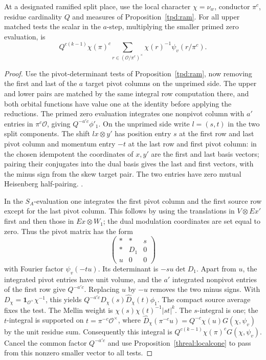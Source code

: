\begin{corollary}\label{threal:ramA}
At a designated ramified split place, use the local character
\(\chi=\nu_w\), conductor \(\pi^c\), residue cardinality \(Q\)
and measures of Proposition~\ref{tpd:ram}. For all upper matched
tests the scalar in the \(a\)-step, multiplying the smaller primed
zero evaluation, is
\[
       Q^{c(k-1)}\chi(\pi)^c
       \sum_{r\in(\mathcal O/\pi^c)^\times}
                         \chi(r)^{-1}\psi_v(r/\pi^c).
\]
\end{corollary}
\begin{proof}
Use the pivot-determinant tests of Proposition~\ref{tpd:ram},
now removing the first and last of the \(a\) target pivot columns
on the unprimed side. The upper and lower pairs are matched by the
same integral row computation there, and both orbital functions
have value one at the identity before applying the reductions.
The primed zero evaluation integrates one nonpivot column with
\(a'\) entries in \(\pi^c\mathcal O\), giving
\(Q^{-a'c}\phi'_1\). On the unprimed side write
\(l=(s,t)\) in the two split components. The shift \(l x\otimes y'\)
has position entry \(s\) at the first row and last pivot column
and momentum entry \(-t\) at the last row and first pivot column:
in the chosen idempotent the coordinates of \(x,y'\) are the
first and last basis vectors; pairing their conjugates into the
dual basis gives the last and first vectors, with the minus sign
from the skew target pair. The two entries have zero mutual
Heisenberg half-pairing.
.

In the \(S_A\)-evaluation one integrates the first pivot column
and the first source row except for the last pivot column. This
follows by using the translations in \(V\otimes Ex'\) first
and then those in \(Ex\otimes W_1\); the dual modulation
coordinates are set equal to zero. Thus the pivot matrix has
the form
\[
      \begin{pmatrix} *&*&s\\ *&D_1&0\\ u&0&0\end{pmatrix}
\]
with Fourier factor \(\psi_v(-tu)\). Its determinant is
\(-su\det D_1\). Apart from \(u\), the integrated pivot entries
have unit volume, and the \(a'\) integrated nonpivot entries of
the first row give \(Q^{-a'c}\). Replacing \(u\) by \(-u\)
removes the two minus signs. With
\(D_\chi=\mathbf1_{\mathcal O^\times}\chi^{-1}\), this yields
\(Q^{-a'c}D_\chi(s)\widehat D_\chi(t)\phi_1\).
The compact source average fixes the test. The Mellin weight is
\(\chi(s)\chi(t)^{-1}|st|^k\). The \(s\)-integral is one; the
\(t\)-integral is supported on \(t=\pi^{-c}\mathcal O^\times\),
where \(\widehat D_\chi(\pi^{-c}u)=
 Q^{-c}\chi(u)G(\chi,\psi_v)\) by the unit residue sum.
Consequently this integral is \(Q^{c(k-1)}\chi(\pi)^c
G(\chi,\psi_v)\). Cancel the common factor \(Q^{-a'c}\) and use
Proposition~\ref{threal:localcone} to pass from this nonzero
smaller vector to all tests.
\end{proof}

